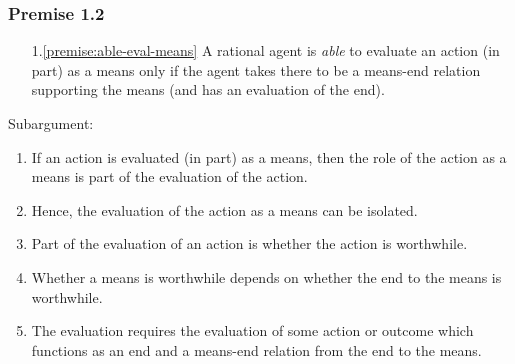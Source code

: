\documentclass[noamssymb,
]{beamer} %
\newcommand{\hozlinedash}[0]{
  \noindent\hdashrule[0.5ex][c]{\textwidth}{.1pt}{2.5pt}
}
\begin{document}
\begin{frame}
  \frametitle{Premise 1.2}

  \begin{enumerate}
  \item[1.\ref{premise:able-eval-means}] A rational agent is \emph{able} to evaluate an action (in part) as a means only if the agent takes there to be a means-end relation supporting the means (and has an evaluation of the end).
  \end{enumerate}

  \hozlinedash

  Subargument:

  \begin{enumerate}
  \item If an action is evaluated (in part) as a means, then the role of the action as a means is part of the evaluation of the action.
  \item Hence, the evaluation of the action as a means can be isolated.
  \item Part of the evaluation of an action is whether the action is worthwhile.
  \item Whether a means is worthwhile depends on whether the end to the means is worthwhile.
  \item The evaluation requires the evaluation of some action or outcome which functions as an end and a means-end relation from the end to the means.
  \end{enumerate}
\end{frame}
\end{document}
